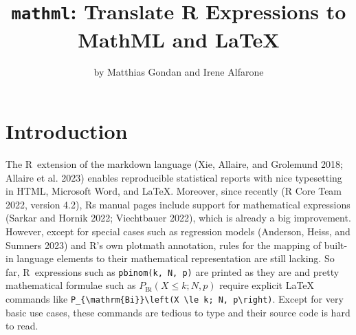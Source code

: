 \title{\texttt{mathml}: Translate R Expressions to MathML and LaTeX}


\author{by Matthias Gondan and Irene Alfarone}

\maketitle


\hypertarget{introduction}{%
\section{Introduction}\label{introduction}}

The R~extension of the markdown language (Xie, Allaire, and Grolemund 2018; Allaire et al. 2023) enables
reproducible statistical reports with nice typesetting in HTML, Microsoft Word,
and LaTeX. Moreover, since recently (R Core Team 2022, version 4.2), R\textquotesingle s manual pages
include support for mathematical expressions (Sarkar and Hornik 2022; Viechtbauer 2022),
which is already a big improvement. However, except for special cases
such as regression models (Anderson, Heiss, and Sumners 2023) and R's own plotmath annotation,
rules for the mapping of built-in language elements to their mathematical
representation are still lacking. So far, R~expressions such
as \texttt{pbinom(k,\ N,\ p)} are printed as they are and pretty mathematical formulae
such as \(P_{\mathrm{Bi}}(X \le k; N, p)\) require explicit LaTeX commands
like \texttt{P\_\{\textbackslash{}mathrm\{Bi\}\}\textbackslash{}left(X\ \textbackslash{}le\ k;\ N,\ p\textbackslash{}right)}. Except for very basic use
cases, these commands are tedious to type and their source code is hard to
read.

